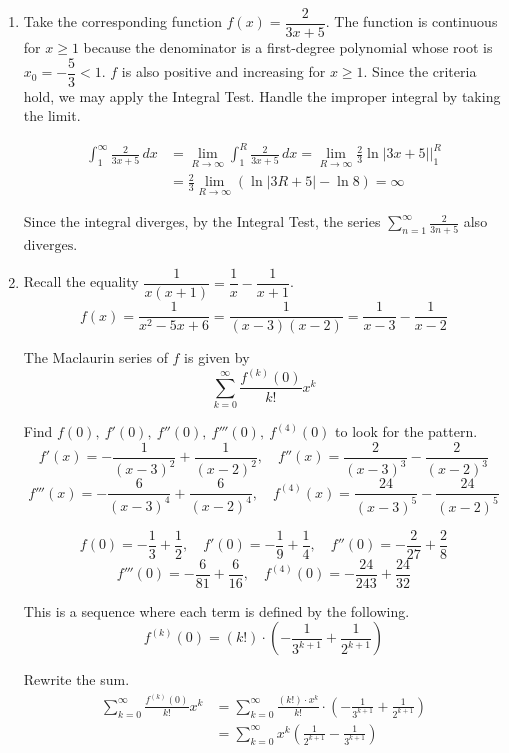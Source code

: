 \documentclass[a4paper, 12pt]{article}
\begin{document}
\begin{enumerate}[leftmargin=*,label=\textbf{\arabic*.}]
\item Take the corresponding function $f(x)=\dfrac2{3x+5}$. The function is continuous for $x\geq1$ because the denominator is a first-degree polynomial whose root is $x_0=-\dfrac53<1$. $f$ is also positive and increasing for $x\geq1$. Since the criteria hold, we may apply the Integral Test. Handle the improper integral by taking the limit.

\begin{align*}\int_1^{\infty}\frac{2}{3x+5}\,dx&=\lim_{R\to\infty}\int_1^R\frac{2}{3x+5}\,dx=\lim_{R\to\infty}\frac23\ln|3x+5|\bigg|_1^R\\[1em]&=\frac23\lim_{R\to\infty}\left(\ln|3R+5|-\ln8\right)=\infty\end{align*}

Since the integral diverges, by the Integral Test, the series $\displaystyle\sum_{n=1}^{\infty}\frac2{3n+5}$ also $\boxed{\text{diverges}}$.

\item Recall the equality $\dfrac1{x(x+1)}=\dfrac1{x}-\dfrac1{x+1}$.
\[f(x)=\frac1{x^2-5x+6}=\frac1{(x-3)(x-2)}=\frac1{x-3}-\frac1{x-2}\]

The Maclaurin series of $f$ is given by
\[\sum_{k=0}^{\infty}\frac{f^{(k)}(0)}{k!}x^k\]

Find $f(0),\:f'(0),\:f''(0),\:f'''(0),\:f^{(4)}(0)$ to look for the pattern.
\[f'(x)=-\frac1{(x-3)^2}+\frac1{(x-2)^2},\quad f''(x)=\frac2{(x-3)^3}-\frac2{(x-2)^3}\]
\[f'''(x)=-\frac6{(x-3)^4}+\frac6{(x-2)^4},\quad f^{(4)}(x)=\frac{24}{(x-3)^5}-\frac{24}{(x-2)^5}\]

\[f(0)=-\frac13+\frac12,\quad f'(0)=-\frac19+\frac14,\quad f''(0)=-\frac2{27}+\frac28\]
\[f'''(0)=-\frac6{81}+\frac6{16},\quad f^{(4)}(0)=-\frac{24}{243}+\frac{24}{32}\]

This is a sequence where each term is defined by the following.
\[f^{(k)}(0)=(k!)\cdot\left(-\frac1{3^{k+1}}+\frac1{2^{k+1}}\right)\]

Rewrite the sum.
\begin{align*}\sum_{k=0}^{\infty}\frac{f^{(k)}(0)}{k!}x^k&=\sum_{k=0}^{\infty}\frac{(k!)\cdot x^k}{k!}\cdot\left(-\frac1{3^{k+1}}+\frac1{2^{k+1}}\right)\\[1em]&=\boxed{\sum_{k=0}^{\infty}x^k\left(\frac1{2^{k+1}}-\frac1{3^{k+1}}\right)}\end{align*}

\end{enumerate}

\newpage
{}
{}
\end{document}
